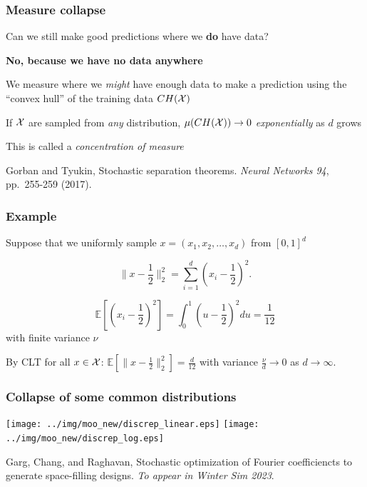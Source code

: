 \documentclass[aspectratio=169]{beamer}
\begin{document}
\begin{frame}
\frametitle{Measure collapse}

Can we still make good predictions where we {\bf do} have data?

\bigskip
\pause

{\bf No, because we have no data anywhere}

\bigskip

We measure where we {\sl might} have enough data to make a prediction
using the ``convex hull'' of the training data $CH({\cal X})$

\bigskip
\pause

If ${\cal X}$ are sampled from {\sl any} distribution,
$\mu(CH({\cal X})) \rightarrow 0$ {\sl exponentially} as $d$ grows

\bigskip

This is called a {\sl concentration of measure}

\vfill

{\tiny Gorban and Tyukin,
Stochastic separation theorems.
{\sl Neural Networks 94}, pp.~255-259 (2017).}

\end{frame}

\begin{frame}
\frametitle{Example}

Suppose that we uniformly sample $x = (x_1, x_2, \ldots, x_d)$ from $[0, 1]^d$

\bigskip

$$
\|x - \frac{1}{2}\|_2^2 = \sum_{i=1}^d{(x_i - \frac{1}{2})^2}.
$$

$$
\mathbb{E}\left[ \left(x_i - \frac{1}{2}\right)^2 \right]
= \int_{0}^1 \left(u - \frac{1}{2}\right)^2 du
= \frac{1}{12}
$$
with finite variance $\nu$

\bigskip

By CLT for all $x \in {\cal X}$:
$\mathbb{E}[\|x - \frac{1}{2}\|_2^2] = \frac{d}{12}$
with variance $\frac{\nu}{d}\rightarrow 0$ as $d\rightarrow\infty$.

\end{frame}

\begin{frame}
\frametitle{Collapse of some common distributions}

\begin{center}
\texttt{[image: ../img/moo\_new/discrep\_linear.eps]}
\texttt{[image: ../img/moo\_new/discrep\_log.eps]}
\end{center}

\vfill

{\tiny Garg, Chang, and Raghavan,
Stochastic optimization of Fourier coefficiencts to generate space-filling designs.
{\sl To appear in Winter Sim 2023}.}

\end{frame}
\end{document}
